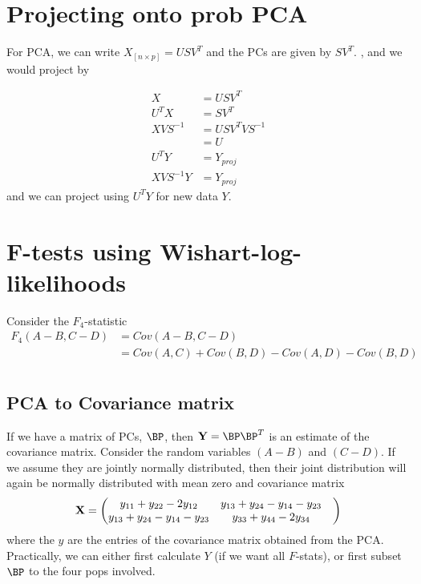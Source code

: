 \documentclass[12pt, letterpaper]{article}
\begin{document}
\section{Projecting onto prob PCA}

For PCA, we can write $X_{[n \times p]} = USV^T$ and the PCs are given by $SV^T$. , and we would project by


\begin{align}
    X &= USV^T \\
    U^T X &= SV^T \\
    XVS^{-1} &= USV^TVS^{-1} \\
    &= U \\
    U^T Y &= Y_{proj}\\
    XVS^{-1}Y &= Y_{proj}
\end{align}
and we can project using $U^TY $ for new data $Y$. 


\newpage
\section{F-tests using Wishart-log-likelihoods}
Consider the $F_4$-statistic
\begin{align}
    F_4(A-B, C-D)&= Cov(A-B, C-D)\\ &= Cov(A, C) + Cov(B,D) - Cov(A,D) - Cov(B,D)\\
\end{align}


\subsection{PCA to Covariance matrix}
If we have a matrix of PCs, $\BP$, then $\mathbf{Y} = \BP\BP^T$ is an estimate of the covariance matrix. Consider the random variables $(A-B)$ and $(C-D)$. If we assume they are jointly normally distributed, then their joint distribution will again be normally distributed with mean zero and covariance matrix 
\begin{equation}
    \bf{X} = \begin{pmatrix} 
    y_{11} + y_{22} - 2 y_{12} & y_{13} + y_{24} - y_{14} - y_{23} \\
    y_{13} + y_{24} - y_{14} - y_{23} & y_{33} + y_{44} - 2 y_{34} &  \\
    \end{pmatrix}
\end{equation}
where the $y$ are the entries of the  covariance matrix obtained from the PCA. Practically, we can either first calculate $Y$ (if we want all $F$-stats), or first subset $\BP$ to the four pops involved.
\end{document}
